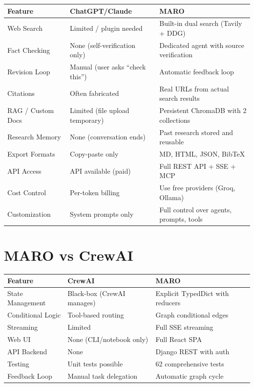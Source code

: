 \documentclass[11pt,a4paper,twoside]{report}
\begin{document}
\begin{longtable}{|p{3.5cm}|p{5cm}|p{5cm}|}
\hline
\textbf{Feature} & \textbf{ChatGPT/Claude} & \textbf{MARO} \\
\hline
\endhead
Web Search & Limited / plugin needed & Built-in dual search (Tavily + DDG) \\
\hline
Fact Checking & None (self-verification only) & Dedicated agent with source verification \\
\hline
Revision Loop & Manual (user asks ``check this'') & Automatic feedback loop \\
\hline
Citations & Often fabricated & Real URLs from actual search results \\
\hline
RAG / Custom Docs & Limited (file upload temporary) & Persistent ChromaDB with 2 collections \\
\hline
Research Memory & None (conversation ends) & Past research stored and reusable \\
\hline
Export Formats & Copy-paste only & MD, HTML, JSON, BibTeX \\
\hline
API Access & API available (paid) & Full REST API + SSE + MCP \\
\hline
Cost Control & Per-token billing & Use free providers (Groq, Ollama) \\
\hline
Customization & System prompts only & Full control over agents, prompts, tools \\
\hline
\end{longtable}

\section{MARO vs CrewAI}

\begin{longtable}{|p{3.5cm}|p{5cm}|p{5cm}|}
\hline
\textbf{Feature} & \textbf{CrewAI} & \textbf{MARO} \\
\hline
State Management & Black-box (CrewAI manages) & Explicit TypedDict with reducers \\
\hline
Conditional Logic & Tool-based routing & Graph conditional edges \\
\hline
Streaming & Limited & Full SSE streaming \\
\hline
Web UI & None (CLI/notebook only) & Full React SPA \\
\hline
API Backend & None & Django REST with auth \\
\hline
Testing & Unit tests possible & 62 comprehensive tests \\
\hline
Feedback Loop & Manual task delegation & Automatic graph cycle \\
\hline
\end{longtable}
\end{document}
